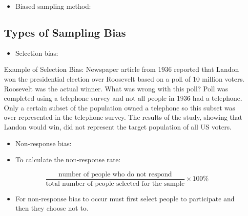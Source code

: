\documentclass[
]{report}
\providecommand{\tightlist}{%
  \setlength{\itemsep}{0pt}\setlength{\parskip}{0pt}}
\begin{document}
\begin{itemize}
\tightlist
\item
  Biased sampling method:
\end{itemize}

\vspace{0.5in}

\subsection*{Types of Sampling Bias}\label{types-of-sampling-bias}

\begin{itemize}
\tightlist
\item
  Selection bias:
\end{itemize}

\vspace{0.5in}

Example of Selection Bias: Newspaper article from 1936 reported that Landon won the presidential election over Roosevelt based on a poll of 10 million voters. Roosevelt was the actual winner. What was wrong with this poll? Poll was completed using a telephone survey and not all people in 1936 had a telephone. Only a certain subset of the population owned a telephone so this subset was over-represented in the telephone survey. The results of the study, showing that Landon would win, did not represent the target population of all US voters.

\begin{itemize}
\tightlist
\item
  Non-response bias:
\end{itemize}

\vspace{0.5in}

\begin{itemize}
\tightlist
\item
  To calculate the non-response rate:
\end{itemize}

\[\frac{\text{number of people who do not respond}}{\text{total number of people selected for the sample}}\times 100\%\]

\begin{itemize}
\tightlist
\item
  For non-response bias to occur must first select people to participate and then they choose not to.
\end{itemize}
\end{document}
